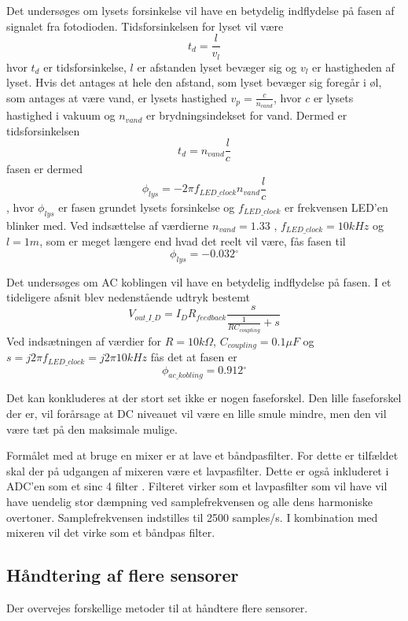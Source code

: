 \documentclass[HardwareDesign/HardwareDesign_main.tex]{subfiles}
\begin{document}
Det undersøges om lysets forsinkelse vil have en betydelig indflydelse på fasen af signalet fra fotodioden. Tidsforsinkelsen for lyset vil være 
$$t_d = \frac{l}{v_l}$$
hvor $t_d$ er tidsforsinkelse, $l$ er afstanden lyset bevæger sig og $v_l$ er hastigheden af lyset. Hvis det antages at hele den afstand, som lyset bevæger sig foregår i øl, som antages at være vand, er lysets hastighed $v_p = \frac{c}{n_{vand}}$, hvor $c$ er lysets hastighed i vakuum og $n_{vand}$ er brydningsindekset for vand.
Dermed er tidsforsinkelsen
$$t_d = n_{vand}\frac{l}{c}$$
fasen er dermed
$$\phi_{lys} = -2 \pi f_{LED\_clock} n_{vand}\frac{l}{c}$$, hvor $\phi_{lys}$ er fasen grundet lysets forsinkelse og $f_{LED\_clock}$ er frekvensen LED'en blinker med. Ved indsættelse af værdierne $n_{vand}=1.33$ \autocite{brydningsindex}, $f_{LED\_clock} = 10kHz$ og $l=1m$, som er meget længere end hvad det reelt vil være, fås fasen til 
$$\phi_{lys} = -0.032 \si{^{\circ}}$$

Det undersøges om AC koblingen vil have en betydelig indflydelse på fasen. I et tideligere afsnit blev nedenstående udtryk bestemt
$$V_{out\_I\_D} = I_D R_{feedback} \frac{s}{\frac{1}{R C_{coupling}} + s}$$
Ved indsætningen af værdier for $R=10k\Omega$, $C_{coupling} = 0.1 \si{\mu F}$ og $s=j2\pi f_{LED\_clock} = j2\pi 10 \si{kHz}$ fås det at fasen er 
$$\phi_{ac\_kobling} = 0.912\si{^{\circ}}$$

Det kan konkluderes at der stort set ikke er nogen faseforskel. Den lille faseforskel der er, vil forårsage at DC niveauet vil være en lille smule mindre, men den vil være tæt på den maksimale mulige. 

Formålet med at bruge en mixer er at lave et båndpasfilter. For dette er tilfældet skal der på udgangen af mixeren være et lavpasfilter. Dette er også inkluderet i ADC'en som et sinc 4 filter \autocite[35]{ADC_DelSig_datasheet}. Filteret virker som et lavpasfilter som vil have vil have uendelig stor dæmpning ved samplefrekvensen og alle dens harmoniske overtoner. Samplefrekvensen indstilles til 2500 samples/s. I kombination med mixeren vil det virke som et båndpas filter.  

\newpage
\subsection{Håndtering af flere sensorer}

Der overvejes forskellige metoder til at håndtere flere sensorer.
\end{document}
